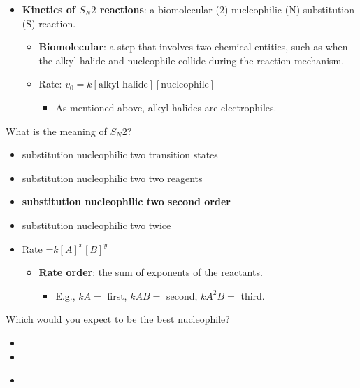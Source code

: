\documentclass[12pt,a4paper]{article}
\begin{document}
\begin{enumerate}
\begin{itemize}
        \item \textbf{Kinetics of \(S_N2\) reactions}: a biomolecular (2) nucleophilic (N) substitution (S) reaction. 
        \begin{itemize}
            \item \textbf{Biomolecular}: a step that involves two chemical entities, such as when the alkyl halide and nucleophile collide during the reaction mechanism. 
            \item Rate: \(v_0 = k[\text{alkyl halide}][\text{nucleophile}]\)
                \begin{itemize}
                    \item As mentioned above, alkyl halides are electrophiles.
                \end{itemize}
        \end{itemize}
    \end{itemize}
    \newpage
    {\color{G-Moon}\item What is the meaning of \(S_N2\)?
    \begin{itemize}
        \item substitution nucleophilic two transition states
        \item substitution nucleophilic two two reagents
        \item {\color{o-Sun}\textbf{substitution nucleophilic two second order}}
        \item substitution nucleophilic two twice
    \end{itemize}
    }
    \begin{itemize}
        \item Rate =\(k[A]^x[B]^y\)
            \begin{itemize}
                \item \textbf{Rate order}: the sum of exponents of the reactants.
                \begin{itemize}
                    \item E.g., \(kA=\) first, \(kAB=\) second, \(kA^2B=\) third.
                \end{itemize}
            \end{itemize}
    \end{itemize}
    {\color{G-Moon}\item Which would you expect to be the best nucleophile?
    \begin{itemize}
        \item {}
        \item {}
        \item {\color{o-Sun}\textbf{}}

\end{itemize}}
\end{enumerate}
\end{document}
